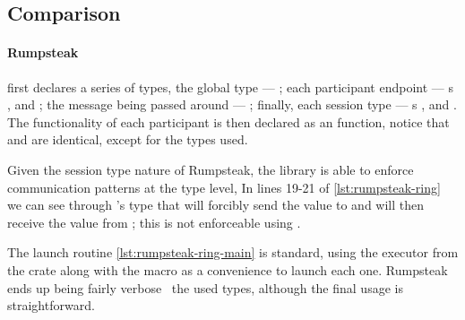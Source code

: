 \subsection{Comparison}

\paragraph{Rumpsteak} first declares a series of types, the global type --- ;
each participant endpoint --- s ,  and ;
the message being passed around --- ;
finally, each session type --- s ,  and .
The functionality of each participant is then declared as an  function,
notice that  and  are identical, except for the types used.

Given the session type nature of Rumpsteak, the library is able to enforce communication patterns at the type level,
In lines 19-21 of \autoref{lst:rumpsteak-ring} we can see through 's type that
 will forcibly send the value to  and will then receive the value from ;
this is not enforceable using .

The launch routine \autoref{lst:rumpsteak-ring-main} is standard,
using the executor from the  crate along with the  macro as a convenience to launch each one.
Rumpsteak ends up being fairly verbose \wrt~the used types,
although the final usage  is straightforward.

